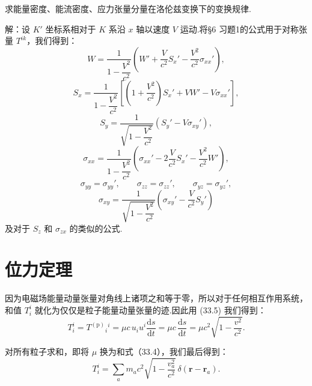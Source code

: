 \begin{xiti}

\quad 求能量密度、能流密度、应力张量分量在洛伦兹变换下的变换规律.

解：设 $K'$ 坐标系相对于 $K$ 系沿 $x$ 轴以速度 $V$ 运动.将§6
习题1的公式用于对称张量 $T^{ik}$，我们得到：
\begin{equation*}
  W=\frac{1}{1-\dfrac{V^2}{c^2}}
  \left(W'+\frac{V}{c^2}S_x'-\frac{V^2}{c^2}\sigma_{xx}'\right),
\end{equation*}
\begin{equation*}
  S_x=\frac{1}{1-\dfrac{V^2}{c^2}}
  \left[\left(1+\frac{V^2}{c^2}\right)S_x'
  +VW'-V\sigma_{xx}'\right],
\end{equation*}
\begin{equation*}
  S_y=\frac{1}{\sqrt{1-\dfrac{V^2}{c^2}}}
  \left(S_y'-V\sigma_{xy}'\right),
\end{equation*}
\begin{equation*}
  \sigma_{xx}=\frac{1}{1-\dfrac{V^2}{c^2}}
  \left(\sigma_{xx}'-2\frac{V}{c^2}S_x'
  -\frac{V^2}{c^2}W'\right),
\end{equation*}
\begin{equation*}
  \sigma_{yy}=\sigma_{yy}',\qquad
  \sigma_{zz}=\sigma_{zz}',\qquad
  \sigma_{yz}=\sigma_{yz}',
\end{equation*}
\begin{equation*}
  \sigma_{xy}=\frac{1}{\sqrt{1-\dfrac{V^2}{c^2}}}
  \left(\sigma_{xy}'-\frac{V}{c^2}S_y'\right)
\end{equation*}
及对于 $S_z$ 和 $\sigma_{zx}$ 的类似的公式.

\end{xiti}

\section{位力定理}

因为电磁场能量动量张量对角线上诸项之和等于零，所以对于任何相互作用系统，和值 $T_i^i$
就化为仅仅是粒子能量动量张量的迹.因此用 (33.5) 我们得到：
\begin{equation*}
  T_i^i={T^{(\mathrm{p})}}_i{}^i
  =\mu c\,u_iu^i\frac{\mathrm{d}s}{\mathrm{d}t}
  =\mu c\,\frac{\mathrm{d}s}{\mathrm{d}t}
  =\mu c^2\sqrt{1-\frac{v^2}{c^2}}.
\end{equation*}

对所有粒子求和，即将 $\mu$ 换为和式（33.4），我们最后得到：
\begin{equation}
  T_i^i=\sum_a m_ac^2\sqrt{1-\frac{v_a^2}{c^2}}\,
  \delta(\boldsymbol{r}-\boldsymbol{r}_a).
\end{equation}

